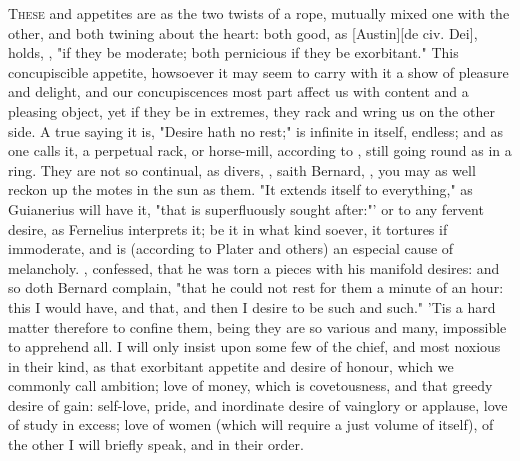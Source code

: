 \lettrine{T}{hese}  and
 appetites are as the two twists of a rope,
mutually mixed one with the other, and both twining about the heart: both good,
as [Austin][\textlatin{de civ. Dei}], holds, ,
"if they be moderate; both pernicious if they be
exorbitant." This concupiscible appetite, howsoever it may seem to carry with
it a show of pleasure and delight, and our concupiscences most part affect us
with content and a pleasing object, yet if they be in extremes, they rack and
wring us on the other side. A true saying it is, "Desire hath no rest;" is
infinite in itself, endless; and as one calls it, a
perpetual rack, or horse-mill, according to \Austin{}, still
going round as in a ring. They are not so continual, as divers, , saith Bernard, , you may as well reckon up the motes in
the sun as them. "It extends itself to everything," as
Guianerius will have it, "that is superfluously sought after:"' or to any
fervent desire, as Fernelius interprets it; be it in what
kind soever, it tortures if immoderate, and is (according to
Plater and others) an especial cause of melancholy.
,
\Austin{} confessed, that he was torn a pieces with his
manifold desires: and so doth Bernard complain, "that he
could not rest for them a minute of an hour: this I would have, and that, and
then I desire to be such and such." 'Tis a hard matter therefore to confine
them, being they are so various and many, impossible to apprehend all. I will
only insist upon some few of the chief, and most noxious in their kind, as that
exorbitant appetite and desire of honour, which we commonly call ambition; love
of money, which is covetousness, and that greedy desire of gain: self-love,
pride, and inordinate desire of vainglory or applause, love of study in excess;
love of women (which will require a just volume of itself), of the other I will
briefly speak, and in their order.

